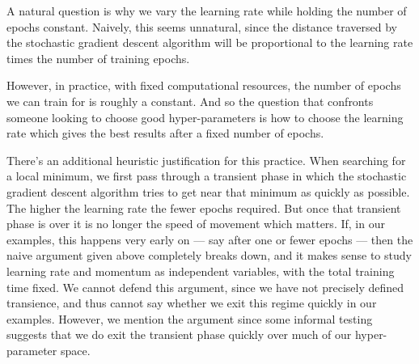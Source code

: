 \documentclass[10pt]{article}
\begin{document}
A natural question is why we vary the learning rate while holding the
number of epochs constant.  Naively, this seems unnatural, since the
distance traversed by the stochastic gradient descent algorithm will
be proportional to the learning rate times the number of training
epochs.

However, in practice, with fixed computational resources, the number
of epochs we can train for is roughly a constant.  And so the question
that confronts someone looking to choose good hyper-parameters is how
to choose the learning rate which gives the best results after a fixed
number of epochs.

There's an additional heuristic justification for this practice. When
searching for a local minimum, we first pass through a transient phase
in which the stochastic gradient descent algorithm tries to get near
that minimum as quickly as possible.  The higher the learning rate the
fewer epochs required.  But once that transient phase is over it is no
longer the speed of movement which matters.  If, in our examples, this
happens very early on --- say after one or fewer epochs --- then the
naive argument given above completely breaks down, and it makes sense
to study learning rate and momentum as independent variables, with the
total training time fixed.  We cannot defend this argument, since we
have not precisely defined transience, and thus cannot say whether we
exit this regime quickly in our examples.  However, we mention the
argument since some informal testing suggests that we do exit the
transient phase quickly over much of our hyper-parameter space.

%
%
\end{document}

